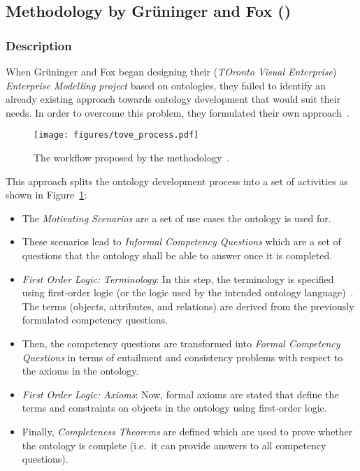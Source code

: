\subsection{Methodology by Grüninger and Fox ()}
\label{subsec:approach4}

\subsubsection{Description}

When Grüninger and Fox began designing their  (\emph{TOronto Visual Enterprise}) \emph{Enterprise Modelling project} based on ontologies, they failed to identify an already existing approach towards ontology development that would suit their needs. In order to overcome this problem, they formulated their own approach~\cite{GruningerFox}.

\begin{figure}
\centering
\texttt{[image: figures/tove\_process.pdf]}
\caption[The workflow proposed by ]{The workflow proposed by the  methodology~\cite{GruningerFox}.}
\label{fig:tove_process}
\end{figure}


This approach splits the ontology development process into a set of activities as shown in Figure~\ref{fig:tove_process}:

\begin{itemize}
  \item The \emph{Motivating Scenarios} are a set of use cases the ontology is used for.
  \item These scenarios lead to \emph{Informal Competency Questions} which are a set of questions that the ontology shall be able to answer once it is completed.
  \item \emph{First Order Logic: Terminology}: In this step, the terminology is specified using first-order logic (or the logic used by the intended ontology language)~\cite{FirstOrderLogic}. The terms (objects, attributes, and relations) are derived from the previously formulated competency questions.
  \item Then, the competency questions are transformed into \emph{Formal Competency Questions} in terms of entailment and consistency problems with respect to the axioms in the ontology.
  \item \emph{First Order Logic: Axioms}: Now, formal axioms are stated that define the terms and constraints on objects in the ontology using first-order logic.
  \item Finally, \emph{Completeness Theorems} are defined which are used to prove whether the ontology is complete (i.e.\ it can provide answers to all competency questions).
\end{itemize}

